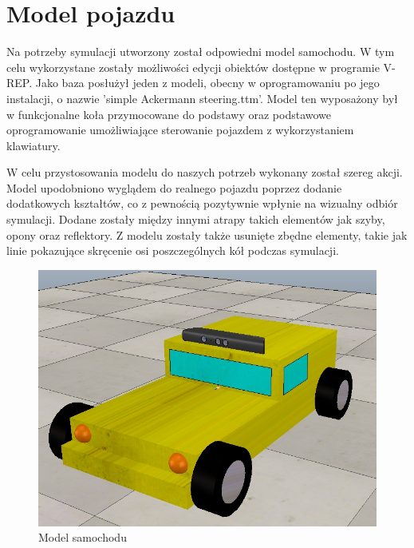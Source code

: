 \section{Model pojazdu}
Na potrzeby symulacji utworzony został odpowiedni model samochodu. W tym celu wykorzystane zostały możliwości edycji obiektów dostępne w programie V-REP. Jako baza posłużył jeden z modeli, obecny w oprogramowaniu po jego instalacji, o nazwie 'simple Ackermann steering.ttm'. Model ten wyposażony był w funkcjonalne koła przymocowane do podstawy oraz podstawowe oprogramowanie umożliwiające sterowanie pojazdem z wykorzystaniem klawiatury.

W celu przystosowania modelu do naszych potrzeb wykonany został szereg akcji. Model upodobniono wyglądem do realnego pojazdu poprzez dodanie dodatkowych kształtów, co z pewnością pozytywnie wpłynie na wizualny odbiór symulacji. Dodane zostały między innymi atrapy takich elementów jak szyby, opony oraz reflektory. Z modelu zostały także usunięte zbędne elementy, takie jak linie pokazujące skręcenie osi poszczególnych kół podczas symulacji.

\begin{figure}[!h]
	\centering
	\includegraphics[width=.8\linewidth]{car.jpg}
	\caption{Model samochodu}
	\label{fig:model}
\end{figure}

